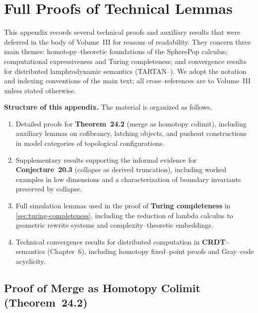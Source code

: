 
\chapter{Full Proofs of Technical Lemmas}
\label{app:technical-lemmas}

This appendix records several technical proofs and auxiliary results
that were deferred in the body of Volume~III for reasons of
readability.  They concern three main themes:
homotopy--theoretic foundations of the SpherePop calculus;
computational expressiveness and Turing completeness; and convergence
results for distributed lamphrodynamic semantics (TARTAN--\rsvpabbr{}).
We adopt the notation and indexing conventions of the main text;
all cross--references are to Volume~III unless stated otherwise.

\bigskip

\noindent\textbf{Structure of this appendix.}  The material is
organized as follows.
\begin{enumerate}
\item Detailed proofs for \textbf{Theorem~24.2} (merge as homotopy
colimit), including auxiliary lemmas on cofibrancy, latching objects,
and pushout constructions in model categories of topological
configurations.

\item Supplementary results supporting the informal evidence for
\textbf{Conjecture~20.3} (collapse as derived truncation), including
worked examples in low dimensions and a characterization of boundary
invariants preserved by collapse.

\item Full simulation lemmas used in the proof of
\textbf{Turing completeness} in \cref{sec:turing-completeness},
including the reduction of lambda calculus to geometric rewrite
systems and complexity--theoretic embeddings.

\item Technical convergence results for distributed computation in
\textbf{CRDT--\rsvpabbr{}} semantics (Chapter~6), including homotopy
fixed--point proofs and Gray--code acyclicity.
\end{enumerate}

\section{Proof of Merge as Homotopy Colimit (Theorem~24.2)}
\label{app:merge-hocolim}

